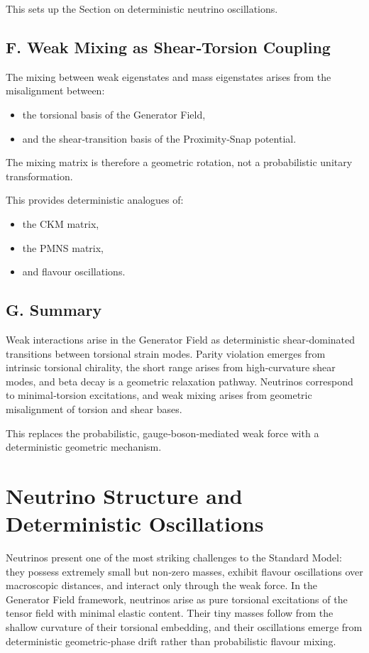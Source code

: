 \documentclass[reprint,amsmath,amssymb,aps,prl,floatfix]{revtex4-2}
\begin{document}
This sets up the Section on deterministic neutrino oscillations.

\subsection{F. Weak Mixing as Shear‑Torsion Coupling}

The mixing between weak eigenstates and mass eigenstates arises from the misalignment between:
\begin{itemize}
\item the torsional basis of the Generator Field,  
\item and the shear‑transition basis of the Proximity‑Snap potential.
\end{itemize}
\medskip

The mixing matrix is therefore a geometric rotation, not a probabilistic unitary transformation.
\medskip

This provides deterministic analogues of:
\begin{itemize}
\item the CKM matrix,  
\item the PMNS matrix,  
\item and flavour oscillations.
\end{itemize}

\subsection{G. Summary}

Weak interactions arise in the Generator Field as deterministic shear‑dominated transitions between torsional strain modes. Parity violation emerges from intrinsic torsional chirality, the short range arises from high‑curvature shear modes, and beta decay is a geometric relaxation pathway. Neutrinos correspond to minimal‑torsion excitations, and weak mixing arises from geometric misalignment of torsion and shear bases.
\medskip

This replaces the probabilistic, gauge‑boson‑mediated weak force with a deterministic geometric mechanism.
\medskip

\section{Neutrino Structure and Deterministic Oscillations}

Neutrinos present one of the most striking challenges to the Standard Model: they possess extremely small but non‑zero masses, exhibit flavour oscillations over macroscopic distances, and interact only through the weak force. In the Generator Field framework, neutrinos arise as pure torsional excitations of the tensor field with minimal elastic content. Their tiny masses follow from the shallow curvature of their torsional embedding, and their oscillations emerge from deterministic geometric‑phase drift rather than probabilistic flavour mixing.
\medskip
\end{document}
